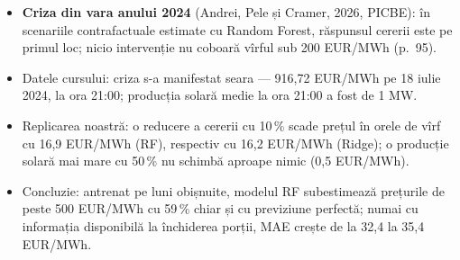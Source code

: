 \begin{itemize}\setlength{\itemsep}{2pt}
  \item \textbf{Criza din vara anului 2024} (Andrei, Pele și Cramer, 2026, PICBE): în scenariile contrafactuale estimate cu Random Forest, răspunsul cererii este pe primul loc; nicio intervenție nu coboară vîrful sub 200 EUR/MWh (p.~95).
  \item Datele cursului: criza s-a manifestat seara --- 916,72 EUR/MWh pe 18 iulie 2024, la ora 21:00; producția solară medie la ora 21:00 a fost de 1 MW.
  \item Replicarea noastră: o reducere a cererii cu 10\,\% scade prețul în orele de vîrf cu 16,9 EUR/MWh (RF), respectiv cu 16,2 EUR/MWh (Ridge); o producție solară mai mare cu 50\,\% nu schimbă aproape nimic (0,5 EUR/MWh).
  \item Concluzie: antrenat pe luni obișnuite, modelul RF subestimează prețurile de peste 500 EUR/MWh cu 59\,\% chiar și cu previziune perfectă; numai cu informația disponibilă la închiderea porții, MAE crește de la 32,4 la 35,4 EUR/MWh.
\end{itemize}
